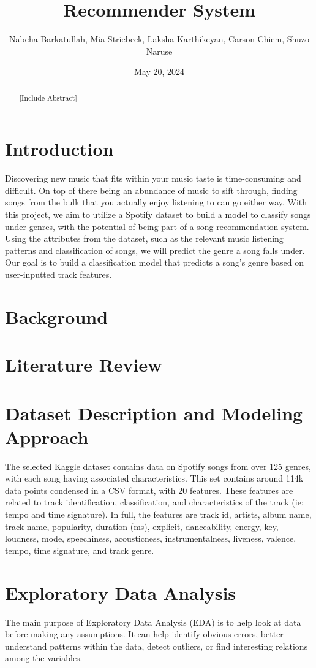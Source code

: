 \documentclass{article}
\title{Recommender System}
\author{Nabeha Barkatullah, Mia Striebeck, Laksha Karthikeyan, Carson Chiem, Shuzo Naruse}
\date{May 20, 2024}
\begin{document}
\maketitle

\newpage
\begin{abstract}
    [Include Abstract]
\end{abstract}
\section{Introduction}
Discovering new music that fits within your music taste is time-consuming and difficult. On top of there being an abundance of music to sift through, finding songs from the bulk that you actually enjoy listening to can go either way. With this project, we aim to utilize a Spotify dataset to build a model to classify songs under genres, with the potential of being part of a song recommendation system. Using the attributes from the dataset, such as the relevant music listening patterns and classification of songs, we will predict the genre a song falls under. Our goal is to build a classification model that predicts a song’s genre based on user-inputted track features.

\section{Background}

\section{Literature Review}

\section{Dataset Description and Modeling Approach}
The selected Kaggle dataset contains data on Spotify songs from over 125 genres, with each song having associated characteristics. This set contains around 114k data points condensed in a CSV format, with 20 features. These features are related to track identification, classification, and characteristics of the track (ie: tempo and time signature). In full, the features are track id, artists, album name, track name, popularity, duration (ms), explicit, danceability, energy, key, loudness, mode, speechiness, acousticness, instrumentalness, liveness, valence, tempo, time signature, and track genre.

\section{Exploratory Data Analysis}
The main purpose of Exploratory Data Analysis (EDA) is to help look at data before making any assumptions. It can help identify obvious errors, better understand patterns within the data, detect outliers, or find interesting relations among the variables.
\end{document}
